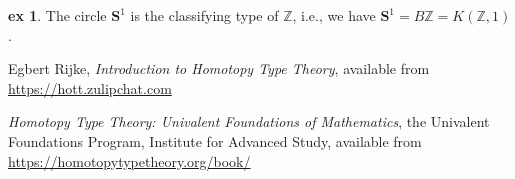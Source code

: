 \documentclass{amsart}
\theoremstyle{theorem}
\theoremstyle{definition}
\newtheorem*{ex}{ex}
\theoremstyle{remark}
\newcommand{\0}{\mathbbe{0}}
\newcommand{\1}{\mathbbe{1}}
\newcommand{\2}{\mathbbe{2}}
\newcommand{\3}{\mathbbe{3}}
\newcommand{\4}{\mathbbe{4}}
\newcommand{\ZZ}{\mathbb{Z}}
\newcommand{\Sone}{\mathbf{S}^1}
\begin{document}
\begin{ex} The circle $\Sone$ is the classifying type of $\ZZ$, i.e., we have $\Sone = B\ZZ = K(\ZZ,1)$.
\end{ex}



\begin{thebibliography}{UF}


 Egbert Rijke, \emph{Introduction to Homotopy Type Theory}, available from \url{https://hott.zulipchat.com}

 \emph{Homotopy Type Theory: Univalent Foundations of Mathematics}, the Univalent Foundations Program, Institute for Advanced Study, available from \url{https://homotopytypetheory.org/book/}

\end{thebibliography}
\end{document}
